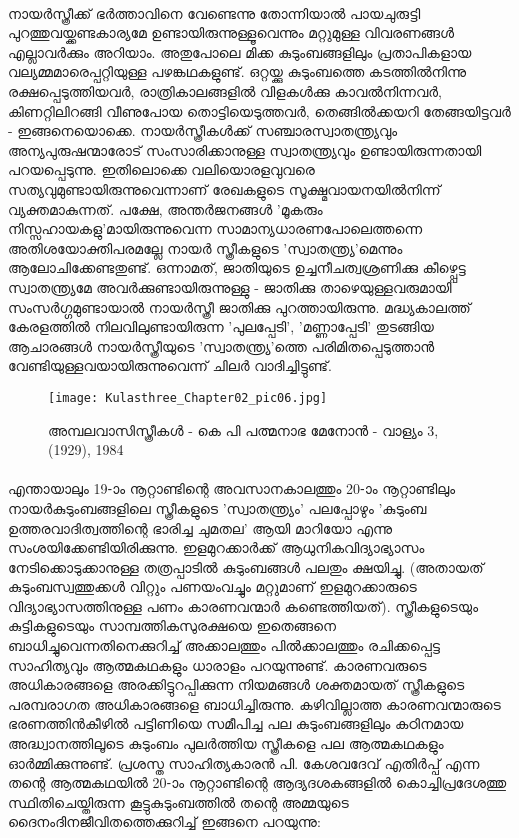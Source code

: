 \paragraph{}നായർസ്ത്രീക്ക് ഭർത്താവിനെ വേണ്ടെന്നു തോന്നിയാൽ പായചുരുട്ടി പുറത്തുവയ്ക്കണ്ടകാര്യമേ ഉണ്ടായിരുന്നുള്ളൂവെന്നും മറ്റുമുള്ള വിവരണങ്ങൾ എല്ലാവർക്കും അറിയാം. അതുപോലെ മിക്ക കുടുംബങ്ങളിലും പ്രതാപികളായ വല്യമ്മമാരെപ്പറ്റിയുള്ള പഴങ്കഥകളുണ്ട്. ഒറ്റയ്ക്കു കുടുംബത്തെ കടത്തിൽനിന്നു രക്ഷപ്പെടുത്തിയവർ, രാത്രികാലങ്ങളിൽ വിളകൾക്കു കാവൽനിന്നവർ, കിണറ്റിലിറങ്ങി വീണുപോയ തൊട്ടിയെടുത്തവർ, തെങ്ങിൽക്കയറി തേങ്ങയിട്ടവർ - ഇങ്ങനെയൊക്കെ. നായർസ്ത്രീകൾക്ക് സഞ്ചാരസ്വാതന്ത്ര്യവും അന്യപുരുഷന്മാരോട് സംസാരിക്കാനുള്ള സ്വാതന്ത്ര്യവും ഉണ്ടായിരുന്നതായി പറയപ്പെടുന്നു. ഇതിലൊക്കെ വലിയൊരളവുവരെ സത്യവുമുണ്ടായിരുന്നുവെന്നാണ് രേഖകളുടെ സൂക്ഷ്മവായനയിൽനിന്ന് വ്യക്തമാകുന്നത്. പക്ഷേ, അന്തർജനങ്ങൾ 'മൂകരും നിസ്സഹായകളു'മായിരുന്നുവെന്ന സാമാന്യധാരണപോലെത്തന്നെ അതിശയോക്തിപരമല്ലേ നായർ സ്ത്രീകളുടെ 'സ്വാതന്ത്ര്യ'മെന്നും ആലോചിക്കേണ്ടതുണ്ട്. ഒന്നാമത്, ജാതിയുടെ ഉച്ചനീചത്വശ്രണിക്കു കീഴ്പ്പെട്ട സ്വാതന്ത്ര്യമേ അവർക്കുണ്ടായിരുന്നുള്ളു - ജാതിക്കു താഴെയുള്ളവരുമായി സംസർഗ്ഗമുണ്ടായാൽ നായർസ്ത്രീ ജാതിക്കു പുറത്തായിരുന്നു. മദ്ധ്യകാലത്ത് കേരളത്തിൽ നിലവിലുണ്ടായിരുന്ന 'പുലപ്പേടി', 'മണ്ണാപ്പേടി' തുടങ്ങിയ ആചാരങ്ങൾ നായർസ്ത്രീയുടെ 'സ്വാതന്ത്ര്യ'ത്തെ പരിമിതപ്പെടുത്താൻ വേണ്ടിയുള്ളവയായിരുന്നുവെന്ന് ചിലർ വാദിച്ചിട്ടുണ്ട്.

\begin{figure}[h]
\begin{center}
\texttt{[image: Kulasthree\_Chapter02\_pic06.jpg]}
\end{center}
\caption*{അമ്പലവാസിസ്ത്രീകൾ - കെ പി പത്മനാഭ മേനോൻ - വാള്യം 3, (1929), 1984}
\end{figure}

\paragraph{}എന്തായാലും 19-ാം നൂറ്റാണ്ടിന്റെ അവസാനകാലത്തും 20-ാം നൂറ്റാണ്ടിലും നായർകുടുംബങ്ങളിലെ സ്ത്രീകളുടെ 'സ്വാതന്ത്ര്യം' പലപ്പോഴും 'കുടുംബ ഉത്തരവാദിത്വത്തിന്റെ ഭാരിച്ച ചുമതല' ആയി മാറിയോ എന്നു സംശയിക്കേണ്ടിയിരിക്കുന്നു. ഇളമുറക്കാർക്ക് ആധുനികവിദ്യാഭ്യാസം നേടിക്കൊടുക്കാനുള്ള തത്രപ്പാടിൽ കുടുംബങ്ങൾ പലതും ക്ഷയിച്ചു. (അതായത് കുടുംബസ്വത്തുക്കൾ വിറ്റും പണയംവച്ചും മറ്റുമാണ് ഇളമുറക്കാരുടെ വിദ്യാഭ്യാസത്തിനുള്ള പണം കാരണവന്മാർ കണ്ടെത്തിയത്). സ്ത്രീകളുടെയും കുട്ടികളുടെയും സാമ്പത്തികസുരക്ഷയെ ഇതെങ്ങനെ ബാധിച്ചുവെന്നതിനെക്കുറിച്ച് അക്കാലത്തും പിൽക്കാലത്തും രചിക്കപ്പെട്ട സാഹിത്യവും ആത്മകഥകളും ധാരാളം പറയുന്നുണ്ട്. കാരണവരുടെ അധികാരങ്ങളെ അരക്കിട്ടുറപ്പിക്കുന്ന നിയമങ്ങൾ ശക്തമായത് സ്ത്രീകളുടെ പരമ്പരാഗത അധികാരങ്ങളെ ബാധിച്ചിരുന്നു. കഴിവില്ലാത്ത കാരണവന്മാരുടെ ഭരണത്തിൻകീഴിൽ പട്ടിണിയെ സമീപിച്ച പല കുടുംബങ്ങളിലും കഠിനമായ അദ്ധ്വാനത്തിലൂടെ കുടുംബം പുലർത്തിയ സ്ത്രീകളെ പല ആത്മകഥകളും ഓർമ്മിക്കുന്നുണ്ട്. പ്രശസ്ത സാഹിത്യകാരൻ പി. കേശവദേവ് എതിർപ്പ് എന്ന തന്റെ ആത്മകഥയിൽ 20-ാം നൂറ്റാണ്ടിന്റെ ആദ്യദശകങ്ങളിൽ കൊച്ചിപ്രദേശത്തു സ്ഥിതിചെയ്തിരുന്ന കൂട്ടുകുടുംബത്തിൽ തന്റെ അമ്മയുടെ ദൈനംദിനജീവിതത്തെക്കുറിച്ച് ഇങ്ങനെ പറയുന്നു:

